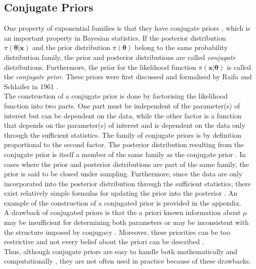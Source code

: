 \subsection{Conjugate Priors}
One property of exponential families is that they have conjugate priors \autocite[][]{diaconis1979conjugate}, which is an important property in Bayesian statistics. If the posterior distribution $\pi\left(\pmb{\theta}|\pmb{x}\right)$ and the prior distribution $\pi\left(\pmb{\theta}\right)$ belong to the same probability distribution family, the prior and posterior distributions are called \textit{conjugate} distributions. Furthermore, the prior for the likelihood function $\pi\left(\pmb{x}|\pmb{\theta}\right)$ is called the \textit{conjugate prior}. These priors were first discussed and formalised by Raifa and Schlaifer in 1961 \autocite[][]{raiffaapplied}. \\
The construction of a conjugate prior is done by factorising the likelihood function into two parts. One part must be independent of the parameter(s) of interest but can be dependent on the data, while the other factor is a function that depends on the parameter(s) of interest and is dependent on the data only through the sufficient statistics. The family of conjugate priors is by definition proportional to the second factor. The posterior distribution resulting from the conjugate prior is itself a member of the same family as the conjugate prior \autocite[][]{raiffaapplied}. In cases where the prior and posterior distributions are part of the same family, the prior is said to be closed under sampling. Furthermore, since the data are only incorporated into the posterior distribution through the sufficient statistics, there exist relatively simple formulas for updating the prior into the posterior \autocite[][]{fink1997compendium}. An example of the construction of a conjugated prior is provided in the appendix. \\
A drawback of conjugated priors is that the a priori known information about $\mu$ may be insufficient for determining both parameters or may be inconsistent with the structure imposed by conjugacy \autocite[][]{robert2010bayesian}. Moreover, these priorities can be too restrictive and not every belief about the priori can be described \autocite[][]{irwin2005prior}. \\
Thus, although conjugate priors are easy to handle both mathematically and computationally \autocite[][]{irwin2005prior}, they are not often used in practice because of these drawbacks.
